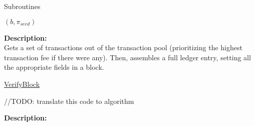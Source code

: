 \documentclass[10pt,a4paper]{article}
\begin{document}
\begin{section}{Subroutines}
\begin{algorithm}[H]
\begin{algorithmic}[1]
    \Return $(b, \pi_{seed})$

    \EndFunction
    \end{algorithmic}
\end{algorithm}

\noindent \textbf{Description:}\\
Gets a set of transactions out of the transaction pool (prioritizing the highest transaction fee if there were any).
Then, assembles a full ledger entry, setting all the appropriate fields in a block.


\begin{algorithm}[H]
    \caption{\underline{VerifyBlock}}    
    \label{algo:verify-block}
    \begin{algorithmic}[1]


    


    //TODO: translate this code to algorithm
    \EndIf







    \EndFunction
    \end{algorithmic}
\end{algorithm}

\noindent \textbf{Description:}\\


\end{section}
\end{document}
